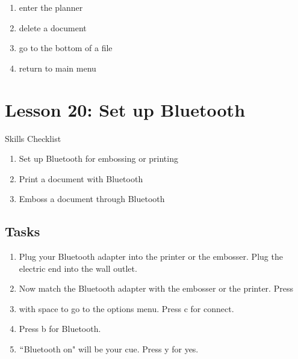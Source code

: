 \documentclass[10pt,letterpaper,twoside]{report}
\begin{document}
{{{{\begin{enumerate}
	      \begin{enumerate}
		      \item enter the planner
		            
		      \item delete a document
		            
		      \item go to the bottom of a file
		            
		      \item return to main menu
	      \end{enumerate}
\end{enumerate}
\section*{Lesson 20: Set up Bluetooth}


Skills Checklist



\begin{enumerate}
	\item Set up Bluetooth for embossing or printing
	      
	\item Print a document with Bluetooth
	      
	\item Emboss a document through Bluetooth
\end{enumerate}



 \subsection{Tasks}



\begin{enumerate}
	\item Plug your Bluetooth adapter into the printer or the embosser.  Plug the electric end into the wall outlet.
	      
	\item Now match the Bluetooth adapter with the embosser or the printer.  Press
	      
	\item with space to go to the options menu.  Press c for connect.
	      
	\item Press b for Bluetooth.
	      
	\item $``$Bluetooth on" will be your cue.  Press y for yes.
	      

\end{enumerate}}}}}
\end{document}
